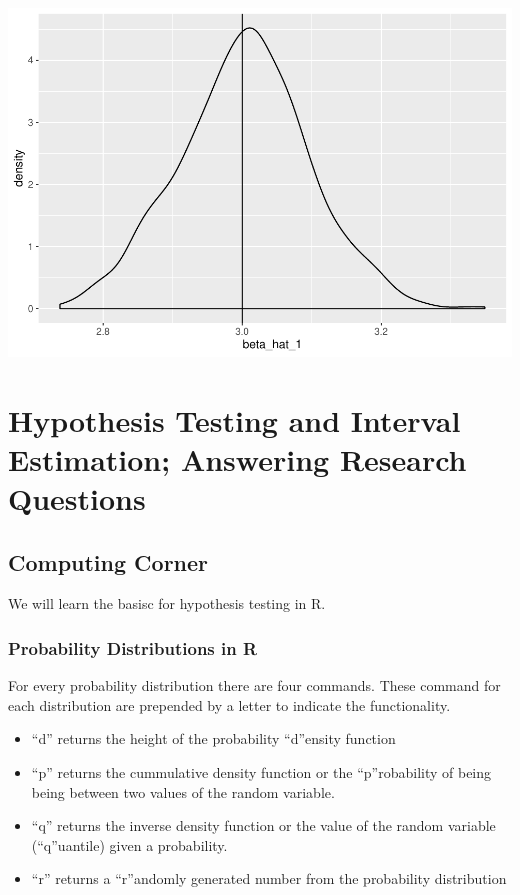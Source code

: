 \documentclass[]{book}
\providecommand{\tightlist}{%
  \setlength{\itemsep}{0pt}\setlength{\parskip}{0pt}}
\begin{document}
\includegraphics{bailey_files/figure-latex/unnamed-chunk-43-2.pdf}

\hypertarget{chp4}{%
\chapter{Hypothesis Testing and Interval Estimation; Answering Research Questions}\label{chp4}}

\hypertarget{computing-corner}{%
\section{Computing Corner}\label{computing-corner}}

We will learn the basisc for hypothesis testing in R.

\hypertarget{probability-distributions-in-r}{%
\subsection{Probability Distributions in R}\label{probability-distributions-in-r}}

For every probability distribution there are four commands. These command for each distribution are prepended by a letter to indicate the functionality.

\begin{itemize}
\tightlist
\item
  ``d'' returns the height of the probability ``d''ensity function
\item
  ``p'' returns the cummulative density function or the ``p''robability of being being between two values of the random variable.
\item
  ``q'' returns the inverse density function or the value of the random variable (``q''uantile) given a probability.
\item
  ``r'' returns a ``r''andomly generated number from the probability distribution
\end{itemize}
\end{document}
